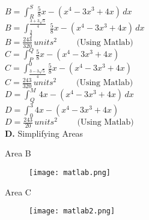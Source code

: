 \documentclass{homework}
\begin{document}
\begin{flushleft}
    $B=\int_R^S \, \frac{5}{8}x-(x^4-3x^3+4x) \,dx$ \vspace{0.8em} \\
    $B=\int_{\frac{3}{2}}^{\frac{3+3 \sqrt{5}}{4}}\,\frac{5}{8}x-(x^4-3x^3+4x)  \, dx$ \vspace{0.8em} \\
    $B=\frac{243}{320}\, units^2 \hspace{2em} \text{ (Using Matlab)}$  \vspace{2.5em} \\
    $C=\int_P^Q \frac{5}{8}x-(x^4-3x^3+4x)$ \vspace{0.8em} \\
    $C=\int_{\frac{3-3 \sqrt{5}}{4}}^0 \frac{5}{8}x-(x^4-3x^3+4x)$ \vspace{0.8em} \\
    $C=\frac{243}{320}\, units^2 \hspace{2em} \text{ (Using Matlab)}$  \vspace{2.5em} \\
    $D=\int_Q^M\,4x-(x^4-3x^3+4x)\, dx$ \vspace{0.8em} \\
    $D=\int_{0}^3 4x-(x^4-3x^3+4x)$ \vspace{0.8em} \\
    $D=\frac{243}{20}\, units^2 \hspace{2em} \text{ (Using Matlab)}$  \vspace{2.5em} \\

\textbf{D. } Simplifying Areas \vspace{0.8em}\\ 
\begin{paracol}{2}
    Area B
    \begin{figure}[htp]
    \centering
    \texttt{[image: matlab.png]}
    \label{fig:matlab}
\end{figure}
\switchcolumn
Area C
    \begin{figure}[htp]
    \centering
    \texttt{[image: matlab2.png]}
    \label{fig:matlab2}
\end{figure}
\end{paracol}



\end{flushleft}
\end{document}
